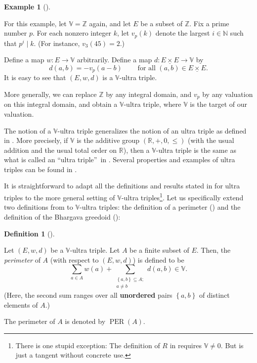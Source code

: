 \documentclass[numbers=enddot,12pt,final,onecolumn,notitlepage]{scrartcl}%
\theoremstyle{definition}
\newtheorem{defi}[theo]{Definition}
\newenvironment{definition}[1][]
{\begin{defi}[#1]\begin{leftbar}}
{\end{leftbar}\end{defi}}
\newtheorem{exam}[theo]{Example}
\newenvironment{example}[1][]
{\begin{exam}[#1]\begin{leftbar}}
{\end{leftbar}\end{exam}}
\let\sumnonlimits\sum
\renewcommand{\sum}{\sumnonlimits\limits}
\newcommand{\timesu}{\mathbin{\underline{\times}}}
\renewcommand{\leq}{\leqslant}
\theoremstyle{plainsl}
\begin{document}
\begin{example}
\label{exa.Vultra.bhar}For this example, let $\mathbb{V}=\mathbb{Z}$ again,
and let $E$ be a subset of $\mathbb{Z}$. Fix a prime number $p$. For each
nonzero integer $k$, let $v_{p}\left(  k\right)  $ denote the largest
$i\in\mathbb{N}$ such that $p^{i}\mid k$. (For instance, $v_{3}\left(
45\right)  =2$.)

Define a map $w:E\rightarrow\mathbb{V}$ arbitrarily. Define a map
$d:E\timesu
E\rightarrow\mathbb{V}$ by%
\[
d\left(  a,b\right)  =-v_{p}\left(  a-b\right)  \ \ \ \ \ \ \ \ \ \ \text{for
all }\left(  a,b\right)  \in E\timesu E.
\]
It is easy to see that $\left(  E,w,d\right)  $ is a $\mathbb{V}$-ultra triple.

More generally, we can replace $\mathbb{Z}$ by any integral domain, and
$v_{p}$ by any valuation on this integral domain, and obtain a $\mathbb{V}%
$-ultra triple, where $\mathbb{V}$ is the target of our valuation.
\end{example}

The notion of a $\mathbb{V}$-ultra triple generalizes the notion of an ultra
triple as defined in \cite{GriPet19}. More precisely, if $\mathbb{V}$ is the
additive group $\left(  \mathbb{R},+,0,\leq\right)  $ (with the usual addition
and the usual total order on $\mathbb{R}$), then a $\mathbb{V}$-ultra triple
is the same as what is called an \textquotedblleft ultra
triple\textquotedblright\ in \cite{GriPet19}. Several properties and examples
of ultra triples can be found in \cite{GriPet19}.

It is straightforward to adapt all the definitions and results stated in
\cite{GriPet19} for ultra triples to the more general setting of $\mathbb{V}%
$-ultra triples\footnote{There is one stupid exception: The definition of $R$
in \cite[Remark 8.13]{GriPet19} requires $\mathbb{V}\neq0$. But \cite[Remark
8.13]{GriPet19} is just a tangent without concrete use.}. Let us specifically
extend two definitions from \cite{GriPet19} to $\mathbb{V}$-ultra triples: the
definition of a perimeter (\cite[\S 3.1]{GriPet19}) and the definition of the
Bhargava greedoid (\cite[\S 6.2]{GriPet19}):

\begin{definition}
Let $\left(  E,w,d\right)  $ be a $\mathbb{V}$-ultra triple. Let $A$ be a
finite subset of $E$. Then, the \textit{perimeter} of $A$ (with respect to
$\left(  E,w,d\right)  $) is defined to be
\[
\sum_{a\in A}w\left(  a\right)  +\sum_{\substack{\left\{  a,b\right\}
\subseteq A;\\a\neq b}}d\left(  a,b\right)  \in\mathbb{V}.
\]
(Here, the second sum ranges over all \textbf{unordered} pairs $\left\{
a,b\right\}  $ of distinct elements of $A$.)

The perimeter of $A$ is denoted by $\operatorname*{PER}\left(  A\right)  $.
\end{definition}
\end{document}
